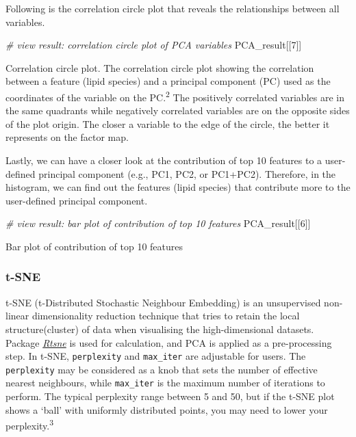 \documentclass[]{article}
\newcommand{\hlnum}[1]{\textcolor[rgb]{0.816,0.125,0.439}{#1}}%
\newcommand{\hlcom}[1]{\textcolor[rgb]{0.502,0.502,0.502}{\textit{#1}}}%
\newcommand{\hlstd}[1]{\textcolor[rgb]{0.251,0.251,0.251}{#1}}%
\newenvironment{Shaded}{\begin{myshaded}}{\end{myshaded}}
\newcommand{\DecValTok}[1]{\hlnum{#1}}
\newcommand{\CommentTok}[1]{\hlcom{#1}}
\newcommand{\NormalTok}[1]{\hlstd{#1}}
\begin{document}
Following is the correlation circle plot that reveals the relationships between all variables.

\begin{Shaded}
\begin{Highlighting}[]
\CommentTok{# view result: correlation circle plot of PCA variables}
\NormalTok{PCA_result[[}\DecValTok{7}\NormalTok{]]}
\end{Highlighting}
\end{Shaded}

\label{fig:unnamed-chunk-9}Correlation circle plot. The correlation circle plot showing the correlation between a feature (lipid species) and a principal component (PC) used as the coordinates of the variable on the PC.\textsuperscript{2} The positively correlated variables are in the same quadrants while negatively correlated variables are on the opposite sides of the plot origin. The closer a variable to the edge of the circle, the better it represents on the factor map.

Lastly, we can have a closer look at the contribution of top 10 features to a user-defined principal component (e.g., PC1, PC2, or PC1+PC2). Therefore, in the histogram, we can find out the features (lipid species) that contribute more to the user-defined principal component.

\begin{Shaded}
\begin{Highlighting}[]
\CommentTok{# view result: bar plot of contribution of top 10 features}
\NormalTok{PCA_result[[}\DecValTok{6}\NormalTok{]]  }
\end{Highlighting}
\end{Shaded}

\label{fig:unnamed-chunk-10}Bar plot of contribution of top 10 features

\hypertarget{t-SNE}{%
\subsubsection{t-SNE}\label{t-SNE}}

t-SNE (t-Distributed Stochastic Neighbour Embedding) is an unsupervised non-linear dimensionality reduction technique that tries to retain the local structure(cluster) of data when visualising the high-dimensional datasets. Package \emph{\href{https://CRAN.R-project.org/package=Rtsne}{Rtsne}} is used for calculation, and PCA is applied as a pre-processing step. In t-SNE, \texttt{perplexity} and \texttt{max\_iter} are adjustable for users. The \texttt{perplexity} may be considered as a knob that sets the number of effective nearest neighbours, while \texttt{max\_iter} is the maximum number of iterations to perform. The typical perplexity range between 5 and 50, but if the t-SNE plot shows a `ball' with uniformly distributed points, you may need to lower your perplexity.\textsuperscript{3}
\end{document}
